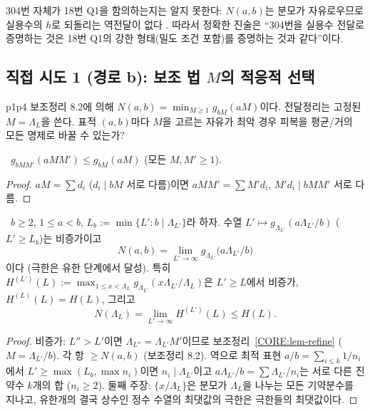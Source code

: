 \begin{remark}\label{CORE:rem-18-converse}
304번 자체가 18번 Q1을 함의하는지는 알지 못한다: $N(a,b)$는 분모가 자유로우므로 실용수의 $h$로 되돌리는 역전달이 없다 \OPEN. 따라서 정확한 진술은 ``304번을 실용수 전달로 증명하는 것은 18번 Q1의 강한 형태(밀도 조건 포함)를 증명하는 것과 같다''이다.
\end{remark}

\subsection{직접 시도 1 (경로 b): 보조 법 $M$의 적응적 선택}
\label{CORE:ssec-routeb}

p1p4 보조정리 8.2에 의해 $N(a,b)=\min_{M\ge1}g_{bM}(aM)$이다. 전달정리는 고정된 $M=\Lambda_L$을 쓴다. 표적 $(a,b)$마다 $M$을 고르는 자유가 최악 경우 피복을 평균/거의 모든 명제로 바꿀 수 있는가?

\begin{lemma}[세분 단조성]\label{CORE:lem-refine}
\PROVED\ $g_{bMM'}(aMM')\le g_{bM}(aM)$ (모든 $M,M'\ge1$).
\end{lemma}
\begin{proof}
$aM=\sum d_i$ ($d_i\mid bM$ 서로 다름)이면 $aMM'=\sum M'd_i$, $M'd_i\mid bMM'$ 서로 다름.
\end{proof}

\begin{theorem}\label{CORE:thm-adaptive}
\PROVED\ $b\ge2$, $1\le a<b$, $L_b:=\min\{L':b\mid\Lambda_{L'}\}$라 하자. 수열 $L'\mapsto g_{\Lambda_{L'}}(a\Lambda_{L'}/b)$ ($L'\ge L_b$)는 비증가이고
\[
N(a,b)=\lim_{L'\to\infty}g_{\Lambda_{L'}}\bigl(a\Lambda_{L'}/b\bigr)
\]
이다 (극한은 유한 단계에서 달성). 특히 $H^{(L')}(L):=\max_{1\le x<\Lambda_L}g_{\Lambda_{L'}}(x\Lambda_{L'}/\Lambda_L)$은 $L'\ge L$에서 비증가, $H^{(L)}(L)=H(L)$, 그리고
\[
N(\Lambda_L)=\lim_{L'\to\infty}H^{(L')}(L)\le H(L).
\]
\end{theorem}
\begin{proof}
비증가: $L''>L'$이면 $\Lambda_{L''}=\Lambda_{L'}M'$이므로 보조정리~\ref{CORE:lem-refine} ($M=\Lambda_{L'}/b$). 각 항 $\ge N(a,b)$ (보조정리 8.2). 역으로 최적 표현 $a/b=\sum_{i\le k}1/n_i$에서 $L'\ge\max(L_b,\max n_i)$이면 $n_i\mid\Lambda_{L'}$이고 $a\Lambda_{L'}/b=\sum\Lambda_{L'}/n_i$는 서로 다른 진약수 $k$개의 합 ($n_i\ge2$). 둘째 주장: $\{x/\Lambda_L\}$은 분모가 $\Lambda_L$을 나누는 모든 기약분수를 지나고, 유한개의 결국 상수인 정수 수열의 최댓값의 극한은 극한들의 최댓값이다.
\end{proof}

